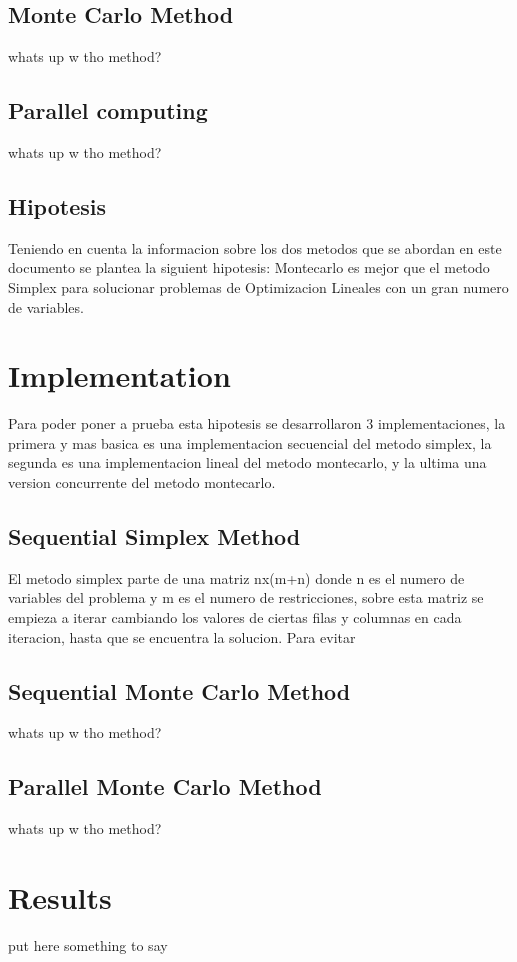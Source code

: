 \documentclass[runningheads]{llncs}
\begin{document}
\subsection{Monte Carlo Method}
whats up w tho method?

\subsection{Parallel computing}
whats up w tho method?

\subsection{Hipotesis}
Teniendo en cuenta la informacion sobre los dos metodos que se abordan en este documento se plantea la siguient hipotesis: 
Montecarlo es mejor que el metodo Simplex para solucionar problemas de Optimizacion Lineales con un gran numero de variables.

\section{Implementation}
Para poder poner a prueba esta hipotesis se desarrollaron 3 implementaciones, la primera y mas basica es una implementacion secuencial del metodo simplex, la segunda es una implementacion lineal del metodo montecarlo, y la ultima una version concurrente del metodo montecarlo.

\subsection{Sequential Simplex Method}
El metodo simplex parte de una matriz nx(m+n) donde n es el numero de variables del problema y m es el numero de restricciones, sobre esta matriz se empieza a iterar cambiando los valores de ciertas filas y columnas en cada iteracion, hasta que se encuentra la solucion.
Para evitar 

\subsection{Sequential Monte Carlo Method}
whats up w tho method?

\subsection{Parallel Monte Carlo Method}
whats up w tho method?

\section{Results}
put here something to say
\end{document}
